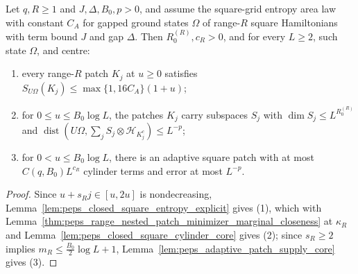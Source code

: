 \begin{lemma}
    \label{thm:peps_range_adaptive_patch_supply}
    \leanok
    Let $q,R\ge1$ and $J,\Delta,B_0,p>0$, and assume the square-grid entropy
    area law with constant $C_A$ for gapped ground states $\Omega$ of range-$R$
    square Hamiltonians with term bound $J$ and gap $\Delta$. Then
    $R_0^{(R)},c_R>0$, and for every $L\ge2$, such state $\Omega$, and centre:
    \begin{enumerate}
        \item every range-$R$ patch $K_j$ at $u\ge0$ satisfies
              $S_{U\Omega}(K_j)\le\max\{1,16C_A\}(1+u)$;
        \item for $0\le u\le B_0\log L$, the patches $K_j$ carry subspaces
              $S_j$ with $\dim S_j\le L^{R_0^{(R)}}$ and
              $\operatorname{dist}(U\Omega,\sum_j S_j\otimes\mathcal H_{K_j^c})\le L^{-p}$;
        \item for $0<u\le B_0\log L$, there is an adaptive square patch with at
              most $C(q,B_0)L^{c_R}$ cylinder terms and error at most $L^{-p}$.
    \end{enumerate}
\end{lemma}
\begin{proof}
    \leanok
    Since $u+s_Rj\in[u,2u]$ is nondecreasing,
    Lemma~\ref{lem:peps_closed_square_entropy_explicit} gives (1), which with
    Lemma~\ref{thm:peps_range_nested_patch_minimizer_marginal_closeness} at
    $\kappa_R$ and Lemma~\ref{lem:peps_closed_square_cylinder_core} gives (2);
    since $s_R\ge2$ implies $m_R\le\frac{B_0}{2}\log L+1$,
    Lemma~\ref{lem:peps_adaptive_patch_supply_core} gives (3).
\end{proof}
